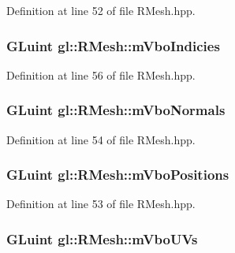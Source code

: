 Definition at line 52 of file R\-Mesh.\-hpp.

\hypertarget{classgl_1_1_r_mesh_a1f5091fc89b32918e1a4cc92ec41a852}{
\subsubsection[{m\-Vbo\-Indicies}]{\setlength{\rightskip}{0pt plus 5cm}G\-Luint gl\-::\-R\-Mesh\-::m\-Vbo\-Indicies\hspace{0.3cm}{\ttfamily [protected]}}}\label{classgl_1_1_r_mesh_a1f5091fc89b32918e1a4cc92ec41a852}


Definition at line 56 of file R\-Mesh.\-hpp.

\hypertarget{classgl_1_1_r_mesh_a5efc2fecfc6da14de8008b1e04694fb8}{
\subsubsection[{m\-Vbo\-Normals}]{\setlength{\rightskip}{0pt plus 5cm}G\-Luint gl\-::\-R\-Mesh\-::m\-Vbo\-Normals\hspace{0.3cm}{\ttfamily [protected]}}}\label{classgl_1_1_r_mesh_a5efc2fecfc6da14de8008b1e04694fb8}


Definition at line 54 of file R\-Mesh.\-hpp.

\hypertarget{classgl_1_1_r_mesh_a89115eb9f8ee1ebd8dc55e68f886170a}{
\subsubsection[{m\-Vbo\-Positions}]{\setlength{\rightskip}{0pt plus 5cm}G\-Luint gl\-::\-R\-Mesh\-::m\-Vbo\-Positions\hspace{0.3cm}{\ttfamily [protected]}}}\label{classgl_1_1_r_mesh_a89115eb9f8ee1ebd8dc55e68f886170a}


Definition at line 53 of file R\-Mesh.\-hpp.

\hypertarget{classgl_1_1_r_mesh_aff4a64a5d46ccd3e1ca67cad783765d7}{
\subsubsection[{m\-Vbo\-U\-Vs}]{\setlength{\rightskip}{0pt plus 5cm}G\-Luint gl\-::\-R\-Mesh\-::m\-Vbo\-U\-Vs\hspace{0.3cm}{\ttfamily [protected]}}}\label{classgl_1_1_r_mesh_aff4a64a5d46ccd3e1ca67cad783765d7}


